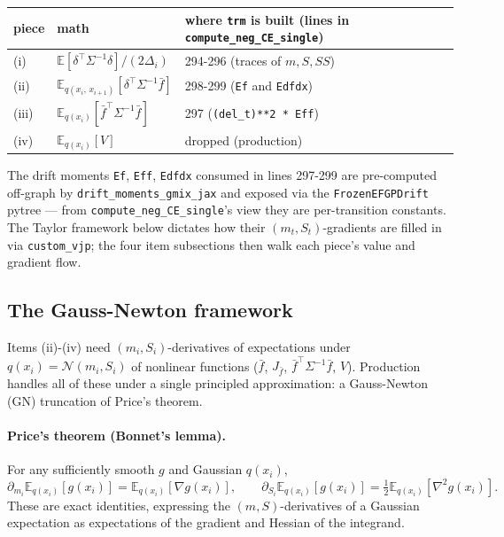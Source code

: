 \documentclass[11pt]{article}
\newcommand{\E}{\mathbb{E}}
\newcommand{\Eqx}{\mathbb{E}_{q(x_i)}}
\newcommand{\Eqxx}{\mathbb{E}_{q(x_i,\,x_{i+1})}}
\newcommand{\code}[1]{\texttt{\small #1}}
\begin{document}
\begin{center}
\renewcommand{\arraystretch}{1.3}
\begin{tabular}{l l l}
\hline
piece & math & where \code{trm} is built (lines in \code{compute\_neg\_CE\_single}) \\\hline
(i)   & $\E[\delta^\top\Sigma^{-1}\delta]/(2\Delta_i)$            & 294-296 (traces of $m, S, SS$) \\
(ii)  & $\Eqxx[\delta^\top\Sigma^{-1}\bar f]$                     & 298-299 (\code{Ef} and \code{Edfdx}) \\
(iii) & $\Eqx[\bar f^\top\Sigma^{-1}\bar f]$                      & 297 (\code{(del\_t)**2 * Eff}) \\
(iv)  & $\Eqx[V]$                                                  & dropped (production) \\\hline
\end{tabular}
\end{center}

The drift moments \code{Ef}, \code{Eff}, \code{Edfdx} consumed in
lines 297-299 are pre-computed off-graph by
\code{drift\_moments\_gmix\_jax} and exposed via the
\code{FrozenEFGPDrift} pytree --- from
\code{compute\_neg\_CE\_single}'s view they are per-transition
constants. The Taylor framework below dictates how their
$(m_t, S_t)$-gradients are filled in via \code{custom\_vjp}; the
four item subsections then walk each piece's value and gradient flow.

\subsection*{The Gauss-Newton framework}

Items (ii)-(iv) need $(m_i, S_i)$-derivatives of expectations under
$q(x_i) = \mathcal{N}(m_i, S_i)$ of nonlinear functions ($\bar f$,
$J_{\bar f}$, $\bar f^\top \Sigma^{-1}\bar f$, $V$). Production handles
all of these under a single principled approximation: a Gauss-Newton
(GN) truncation of Price's theorem.

\paragraph{Price's theorem (Bonnet's lemma).}
For any sufficiently smooth $g$ and Gaussian $q(x_i)$,
\begin{equation}
\partial_{m_i} \E_{q(x_i)}[g(x_i)] = \E_{q(x_i)}[\nabla g(x_i)],
\qquad
\partial_{S_i} \E_{q(x_i)}[g(x_i)] = \tfrac{1}{2}\E_{q(x_i)}[\nabla^2 g(x_i)].
\label{eq:price}
\end{equation}
These are exact identities, expressing the $(m, S)$-derivatives of a
Gaussian expectation as expectations of the gradient and Hessian of
the integrand.
\end{document}
